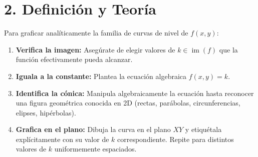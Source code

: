 \documentclass[11pt]{article}
\newenvironment{teoria}{%
  \section*{2. Definición y Teoría}%
}{}
\newenvironment{procesamiento}[1]{%
  \begin{tcolorbox}[colback=gray!5,colframe=gray!60!black,title=Procedimiento: #1]%
}{%
  \end{tcolorbox}%
}
\begin{document}
\begin{teoria}
  \begin{procesamiento}{¿Cómo construir un Mapa de Contorno?}
    Para graficar analíticamente la familia de curvas de nivel de $f(x,y)$:
    \begin{enumerate}
      \item \textbf{Verifica la imagen:} Asegúrate de elegir valores de $k \in \operatorname{im}(f)$ que la función efectivamente pueda alcanzar.
      \item \textbf{Iguala a la constante:} Plantea la ecuación algebraica $f(x,y) = k$.
      \item \textbf{Identifica la cónica:} Manipula algebraicamente la ecuación hasta reconocer una figura geométrica conocida en 2D (rectas, parábolas, circunferencias, elipses, hipérbolas).
      \item \textbf{Grafica en el plano:} Dibuja la curva en el plano $XY$ y etiquétala explícitamente con su valor de $k$ correspondiente. Repite para distintos valores de $k$ uniformemente espaciados.
    \end{enumerate}
  \end{procesamiento}

\end{teoria}
\end{document}
